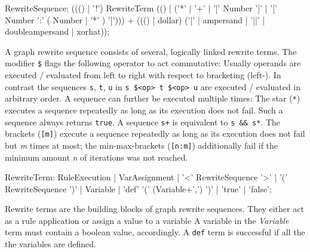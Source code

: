\makeatletter
\begin{rail}
  RewriteSequence: ((() | '!') RewriteTerm (() | ('*' | '+' | '[' Number ']' | '[' Number ':' ( Number | '*' ) ']'))) + ((() | dollar) ('|' | ampersand | '||' | doubleampersand | xorhat));
\end{rail}
A graph rewrite sequence consists of several, logically linked rewrite terms.
The modifier \texttt{\$} flags the following operator to act commutative: Usually operands are executed / evaluated from left to right with respect to bracketing (left-). 
In contrast the sequences \texttt{s}, \texttt{t}, \texttt{u} in \texttt{s \$<op> t \$<op> u} are executed / evaluated in arbitrary order.
A sequence can further be executed multiple times: The star (\texttt{*}) executes a sequence repeatedly as long as its execution does not fail. 
Such a sequence always returns \texttt{true}.
A sequence \verb#s+# is equivalent to \verb#s && s*#.
The brackets (\texttt{[m]}) execute a sequence repeatedly as long as its execution does not fail but \emph{m} times at most; the min-max-brackets (\texttt{[n:m]}) additionally fail if the minimum amount \emph{n} of iterations was not reached.

\begin{rail} 
  RewriteTerm: RuleExecution |
    VarAssignment |
    '<' RewriteSequence '>' | 
    '(' RewriteSequence ')' |
    Variable |
    'def' '(' (Variable+',') ')' |
    'true' |
    'false';
\end{rail}\indexmain{\texttt{<>}}
Rewrite terms are the building blocks of graph rewrite sequences.
They either act as a rule application or assign a value to a variable
A variable in the \emph{Variable} term must contain a boolean value, accordingly.
A \texttt{def} term is successful if all the the variables are defined.

